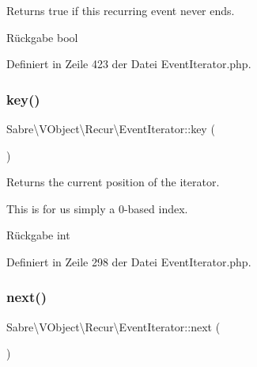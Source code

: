 Returns true if this recurring event never ends.

\begin{DoxyReturn}{Rückgabe}
bool 
\end{DoxyReturn}


Definiert in Zeile 423 der Datei Event\+Iterator.\+php.

\mbox{\label{class_sabre_1_1_v_object_1_1_recur_1_1_event_iterator_a4c71a67e03af5dddfac4f99de11faedc}} 
\subsubsection{\texorpdfstring{key()}{key()}}
{\footnotesize\ttfamily Sabre\textbackslash{}\+V\+Object\textbackslash{}\+Recur\textbackslash{}\+Event\+Iterator\+::key (\begin{DoxyParamCaption}{ }\end{DoxyParamCaption})}

Returns the current position of the iterator.

This is for us simply a 0-\/based index.

\begin{DoxyReturn}{Rückgabe}
int 
\end{DoxyReturn}


Definiert in Zeile 298 der Datei Event\+Iterator.\+php.

\mbox{\label{class_sabre_1_1_v_object_1_1_recur_1_1_event_iterator_a7ca061a824bb8902589cfc69c197372d}} 
\subsubsection{\texorpdfstring{next()}{next()}}
{\footnotesize\ttfamily Sabre\textbackslash{}\+V\+Object\textbackslash{}\+Recur\textbackslash{}\+Event\+Iterator\+::next (\begin{DoxyParamCaption}{ }\end{DoxyParamCaption})}

